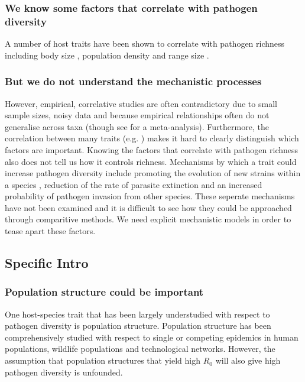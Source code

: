 \subsubsection{We know some factors that correlate with pathogen diversity}
A number of host traits have been shown to correlate with pathogen richness including body size  \cite{kamiya2014determines, arneberg2002host}, population density \cite{nunn2003comparative, arneberg2002host} and range size \cite{bordes2011impact, kamiya2014determines}.




\subsubsection{But we do not understand the mechanistic processes}

However, empirical, correlative studies are often contradictory due to small sample sizes, noisy data and because empirical relationships often do not generalise across taxa (though see \cite{kamiya2014determines} for a meta-analysis).
Furthermore, the correlation between many traits (e.g. \cite{nunn2015infectious}) makes it hard to clearly distinguish which factors are important.
Knowing the factors that correlate with pathogen richness also does not tell us how it controls richness. 
Mechanisms by which a trait could increase pathogen diversity include promoting the evolution of new strains within a species \cite{buckee2004effects}, reduction of the rate of parasite extinction and an increased probability of pathogen invasion from other species.
These seperate mechanisms have not been examined and it is difficult to see how they could be approached through comparitive methods.
We need explicit mechanistic models in order to tease apart these factors.








\subsection{Specific Intro}


\subsubsection{Population structure could be important}
One host-species trait that has been largely understudied with respect to pathogen diversity is population structure.
Population structure has been comprehensively studied with respect to single or competing epidemics in human populations, wildlife populations and technological networks.
However, the assumption that population structures that yield high $R_0$ will also give high pathogen diversity \cite{nunn2003comparative} is unfounded.




